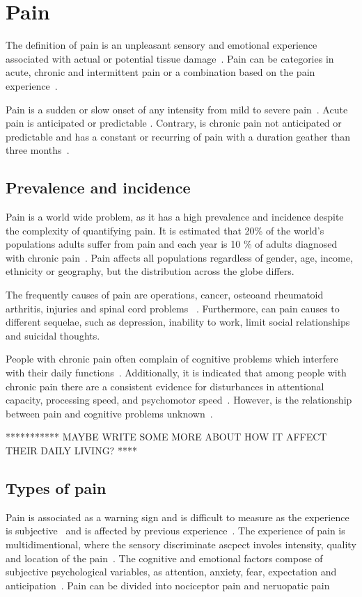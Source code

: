 \chapter{Pain}
The definition of pain is an unpleasant sensory and emotional experience associated with actual or potential tissue damage~\cite{Steeds2013, Mello2016}. Pain can be categories in acute, chronic and intermittent pain or a combination based on the pain experience~\cite{Goldberg2011}. 

Pain is a sudden or slow onset of any intensity from mild to severe pain~\cite{Mello2016}. Acute pain is anticipated or predictable \cite{Mello2016}. Contrary, is chronic pain not anticipated or predictable and has a constant or recurring of pain with a duration geather than three months~\cite{Mello2016}.


\section{Prevalence and incidence}
Pain is a world wide problem, as it has a high prevalence and incidence despite the complexity of quantifying pain\cite{Goldberg2011}. It is estimated that 20\% of the world's populations adults suffer from pain and each year is 10 \% of adults diagnosed with chronic pain~\cite{Goldberg2011}. Pain affects all populations regardless of gender, age, income, ethnicity or geography, but the distribution across the globe differs\cite{Goldberg2011}. 

The frequently causes of pain are operations, cancer, osteoand rheumatoid arthritis, injuries and spinal cord problems ~\cite{Goldberg2011}. Furthermore, can pain causes to different sequelae, such as depression, inability to work, limit social relationships and suicidal thoughts\cite{Goldberg2011}. 

People with chronic pain often complain of cognitive problems which interfere with their daily functions~\cite{Geisser2018}. Additionally, it is indicated that among people with chronic pain there are a consistent evidence for disturbances in attentional capacity, processing speed, and psychomotor speed~\cite{Geisser2018}. However, is the relationship between pain and cognitive problems unknown~\cite{Geisser2018}. 

*********** MAYBE WRITE SOME MORE ABOUT HOW IT AFFECT THEIR DAILY LIVING? ****

\section{Types of pain}
Pain is associated as a warning sign and is difficult to measure as the experience is subjective~\cite{Steeds2013} and is affected by previous experience~\cite{Ahmad2014}. The experience of pain is multidimentional, where the sensory discriminate ascpect involes intensity, quality and location of the pain~\cite{Ahmad2014}. The cognitive and emotional factors compose of subjective psychological variables, as attention, anxiety, fear, expectation and anticipation~\cite{Ahmad2014}. Pain can be divided into nociceptor pain and neruopatic pain~\cite{Steeds2013}


